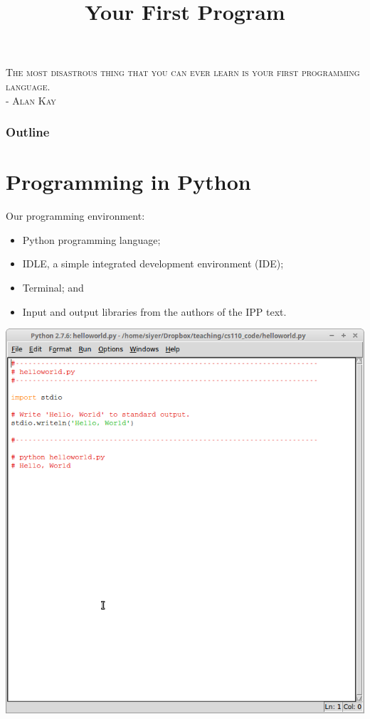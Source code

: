 \documentclass[8pt,a4paper,compress,handout]{beamer}
\title{Your First Program}
\date{}
\begin{document}
\begin{frame}
\begin{flushright}
\tiny \textsc{The most disastrous thing that you can ever learn is your first programming language. \\ - Alan Kay}
\end{flushright}
\titlepage
\end{frame}

\begin{frame}
\frametitle{Outline}
\tableofcontents
\end{frame}

\section{Programming in Python}
\begin{frame}[fragile]
\begin{minipage}{200pt}
Our programming environment:
\begin{itemize}
\item Python programming language;  
\item IDLE, a simple integrated development environment (IDE);
\item Terminal; and
\item Input and output libraries from the authors of the IPP text. \end{itemize}
\end{minipage}%
\begin{minipage}{100pt}
\begin{center}
\includegraphics[scale=0.16]{figures/idle.png}


\end{center}
\end{minipage}
\end{frame}
\end{document}
